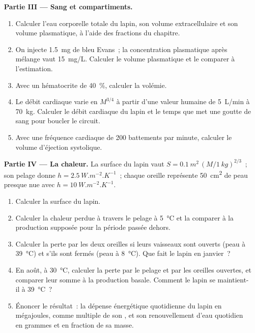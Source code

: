 \begin{problem}
\medskip
\noindent\textbf{Partie III --- Sang et compartiments.}
\begin{enumerate}[resume]
  \item Calculer l'eau corporelle totale du lapin, son volume
        extracellulaire et son volume plasmatique, à l'aide des
        fractions du chapitre.
  \item On injecte \qty{1.5}{mg} de bleu Evans~; la concentration
        plasmatique après mélange vaut \qty{15}{mg/L}. Calculer le
        volume plasmatique et le comparer à l'estimation.
  \item Avec un hématocrite de \qty{40}{\%}, calculer la volémie.
  \item Le débit cardiaque varie en $M^{3/4}$ à partir d'une valeur
        humaine de \qty{5}{L/min} à \qty{70}{kg}. Calculer le débit
        cardiaque du lapin et le temps que met une goutte de sang pour
        boucler le circuit.
  \item Avec une fréquence cardiaque de \qty{200}{} battements par
        minute, calculer le volume d'éjection systolique.
\end{enumerate}

\medskip
\noindent\textbf{Partie IV --- La chaleur.}
La surface du lapin vaut $S = \qty{0.1}{m^2}\,(M/\qty{1}{kg})^{2/3}$~;
son pelage donne $h = \qty{2.5}{W.m^{-2}.K^{-1}}$~; chaque oreille
représente \qty{50}{cm^2} de peau presque nue avec
$h = \qty{10}{W.m^{-2}.K^{-1}}$.
\begin{enumerate}[resume]
  \item Calculer la surface du lapin.
  \item Calculer la chaleur perdue à travers le pelage à
        \qty{5}{\celsius} et la comparer à la production supposée pour
        la période passée dehors.
  \item Calculer la perte par les deux oreilles si leurs vaisseaux sont
        ouverts (peau à \qty{39}{\celsius}) et s'ils sont fermés (peau à
        \qty{8}{\celsius}). Que fait le lapin en janvier~?
  \item En août, à \qty{30}{\celsius}, calculer la perte par le pelage
        et par les oreilles ouvertes, et comparer leur somme à la
        production basale. Comment le lapin se maintient-il à
        \qty{39}{\celsius}~?
  \item Énoncer le résultat~: la dépense énergétique quotidienne du
        lapin en mégajoules, comme multiple de son , et
        son renouvellement d'eau quotidien en grammes et en fraction de
        sa masse.
\end{enumerate}
\end{problem}
